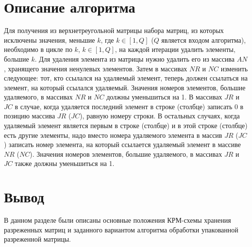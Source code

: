 \section{Описание алгоритма}

Для получения из верхнетреугольной матрицы набора матриц, из которых исключены значения, меньшие $k$, где $k\in [1,Q]$ ($Q$ является входом алгоритма), необходимо в цикле по $k$, $k\in [1,Q]$, на каждой итерации удалить элементы, большие $k$. Для удаления элемента из матрицы нужно удалить его из массива $AN$, хранящего значения ненулевых элементов. Затем в массивах $NR$ и $NC$ изменить следующее: тот, кто ссылался на удаляемый элемент, теперь должен ссылаться на элемент, на который ссылался удаляемый. Значения номеров элементов, большие удаляемого, в массивах $NR$ и $NC$ должны уменьшиться на 1. В массивах $JR$ и $JC$ в случае, когда удаляется последний элемент в строке (столбце) записать 0 в позицию массива $JR$ ($JC$), равную номеру строки. В остальных случаях, когда удаляемый элемент является первым в строке (столбце) и в этой строке (столбце) есть другие элементы, надо вместо номера удаляемого элемента в массив $JR$ ($JC$) записать номер элемента, на который ссылается удаляемый элемент в массиве $NR$ ($NC$). Значения номеров элементов, большие удаляемого, в массивах $JR$ и $JC$ также должны уменьшиться на 1.

\section*{Вывод}

В данном разделе были описаны основные положения КРМ-схемы хранения разреженных матриц и заданного вариантом алгоритма обработки упакованной разреженной матрицы.